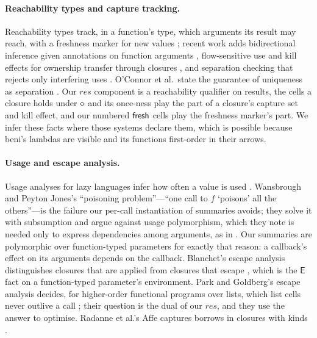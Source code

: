 \paragraph{Reachability types and capture tracking.} Reachability types track, in a function's type, which
arguments its result may reach, with a freshness marker for new values
\citep{bao2021reachability,wei2024polymorphic}; recent work adds bidirectional inference given annotations
on function arguments \citep{jia2026escape}, flow-sensitive use and kill effects for ownership transfer through
closures \citep{deng2025capture}, and separation checking that rejects only interfering uses
\citep{xu2026capybara}. O'Connor et al.\ state the guarantee of uniqueness as separation
\citep{oconnor2026separation}. Our $\mathit{res}$ component is a reachability qualifier on results, the
cells a closure holds under $\diamond$ and its once-ness play the part of a closure's capture set and kill
effect, and our numbered $\mathsf{fresh}$ cells play the freshness marker's part.
We infer these facts where those systems declare them, which is possible because beni's lambdas are visible
and its functions first-order in their arrows.

\paragraph{Usage and escape analysis.} Usage analyses for lazy languages infer how often a value is used
\citep{turner1995once,wansbrough1999once,wansbrough2002thesis}. Wansbrough and Peyton Jones's ``poisoning
problem''---``one call to $f$ `poisons' all the others''---is the failure our per-call instantiation of
summaries avoids; they solve it with subsumption and argue against usage polymorphism, which they note is
needed only to express dependencies among arguments, as in  \citep[\S6.3]{wansbrough1999once}.
Our summaries are polymorphic over function-typed parameters for exactly that reason: a callback's effect
on its arguments depends on the callback. Blanchet's escape analysis distinguishes closures that are
applied from closures that escape \citep{blanchet1998escape}, which is the $\mathsf{E}$ fact on a
function-typed parameter's environment. Park and Goldberg's escape analysis decides, for higher-order
functional programs over lists, which list cells never outlive a call \citep{park1992escape}; their
question is the dual of our $\mathit{res}$, and they use the answer to optimise. Radanne et al.'s Affe
captures borrows in closures with kinds \citep{radanne2020kindly}.

